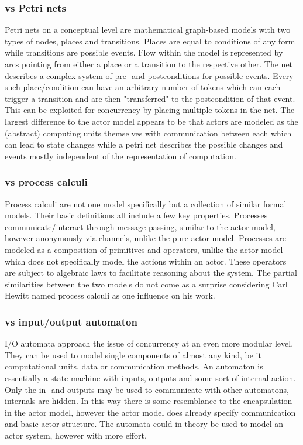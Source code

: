 \documentclass[A4]{article}
\begin{document}
\subsubsection{vs Petri nets}
Petri nets on a conceptual level are mathematical graph-based models with two types of nodes, places and transitions. Places are equal to conditions of any form while transitions are possible events. Flow within the model is represented by arcs pointing from either a place or a transition to the respective other. The net describes a complex system of pre- and postconditions for possible events. Every such place/condition can have an arbitrary number of tokens which can each trigger a transition and are then "transferred" to the postcondition of that event. \cite{Petri2}\cite{murata1989petri} \\
This can be exploited for concurrency by placing multiple tokens in the net. 
The largest difference to the actor model appears to be that actors are modeled as the (abstract) computing units themselves with communication between each which can lead to state changes while a petri net describes the possible changes and events mostly independent of the representation of computation.
\subsubsection{vs process calculi}
Process calculi are not one model specifically but a collection of similar formal models. Their basic definitions all include a few key properties. Processes communicate/interact through message-passing, similar to the actor model, however anonymously via channels, unlike the pure actor model. Processes are modeled as a composition of primitives and operators, unlike the actor model which does not specifically model the actions within an actor. These operators are subject to algebraic laws to facilitate reasoning about the system. \cite{Baeten:2005:BHP:1085667.1085669} The partial similarities between the two models do not come as a surprise considering Carl Hewitt named process calculi as one influence on his work. 
\subsubsection{vs input/output automaton}
I/O automata approach the issue of concurrency at an even more modular level. They can be used to model single components of almost any kind, be it computational units, data or communication methods. An automaton is essentially a state machine with inputs, outputs and some sort of internal action. Only the in- and outputs may be used to communicate with other automatons, internals are hidden. \cite{lynch1996distributed}
In this way there is some resemblance to the encapsulation in the actor model, however the actor model does already specify communication and basic actor structure. The automata could in theory be used to model an actor system, however with more effort.
\end{document}
